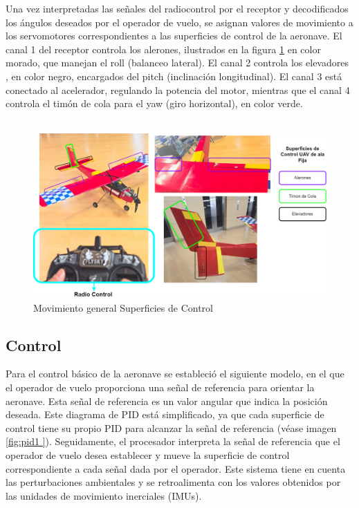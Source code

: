             Una vez interpretadas las señales del radiocontrol por el receptor y decodificados los ángulos deseados por el operador de vuelo, se asignan valores de movimiento a los servomotores correspondientes a las superficies de control de la aeronave. El canal 1 del receptor controla los alerones, ilustrados en la figura \ref{fig:mov-Superficies } en color morado, que manejan el roll (balanceo lateral). El canal 2 controla los elevadores , en color negro, encargados del pitch (inclinación longitudinal). El canal 3 está conectado al acelerador, regulando la potencia del motor, mientras que el canal 4 controla el timón de cola para el yaw (giro horizontal), en color verde.
            \\ \\
            \begin{figure}[H]
                \centering
                \includegraphics[width=\textwidth]{Imagenes/Firmware/Superficies de Control.png}
                \caption{Movimiento general Superficies de Control }
                \label{fig:mov-Superficies }
            \end{figure} 

\subsection{Control} 

    Para el control básico de la aeronave se estableció el siguiente modelo, en el que el operador de vuelo proporciona una señal de referencia para orientar la aeronave. Esta señal de referencia es un valor angular que indica la posición deseada. Este diagrama de PID está simplificado, ya que cada superficie de control tiene su propio PID para alcanzar la señal de referencia (véase imagen \ref{fig:pid1 }). Seguidamente, el procesador interpreta la señal de referencia que el operador de vuelo desea establecer y mueve la superficie de control correspondiente a cada señal dada por el operador. Este sistema tiene en cuenta las perturbaciones ambientales y se retroalimenta con los valores obtenidos por las unidades de movimiento inerciales (IMUs).

